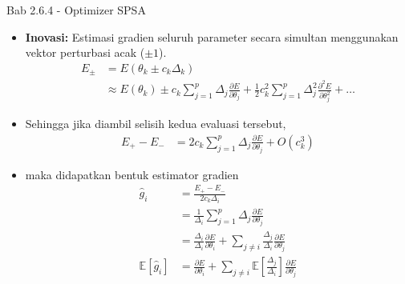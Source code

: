 \begin{frame}{Bab 2.6.4 - Optimizer SPSA}
    \begin{itemize}
        \item \textbf{Inovasi:} Estimasi gradien seluruh parameter secara simultan menggunakan vektor perturbasi acak ($\pm 1$).
        {\tiny
        \begin{equation}
            \begin{split}
                E_{\pm} &= E(\theta_k \pm c_k \Delta_k) \\ 
                &\approx E(\theta_k) \pm c_k \sum_{j=1}^p \Delta_j \frac{\partial E}{\partial \theta_j} + \frac{1}{2} c_k^2 \sum_{j=1}^p \Delta_j^2 \frac{\partial^2 E}{\partial \theta_j^2} + \dots
            \end{split}
        \end{equation}
        }
        \item Sehingga jika diambil selisih kedua evaluasi tersebut,
        {\tiny
        \begin{equation}
            \begin{split}
                E_+ - E_- &= 2 c_k \sum_{j=1}^p \Delta_j \frac{\partial E}{\partial \theta_j} + O(c_k^3)
            \end{split}
        \end{equation}
        }
        \item maka didapatkan bentuk estimator gradien
        {\tiny
        \begin{equation}
            \begin{split}
                \hat{g}_i &= \frac{E_+ - E_-}{2 c_k \Delta_i} \\
                &= \frac{1}{\Delta_i} \sum_{j=1}^p \Delta_j \frac{\partial E}{\partial \theta_j} \\
                &= \frac{\Delta_i}{\Delta_i} \frac{\partial E}{\partial \theta_i} + \sum_{j \neq i} \frac{\Delta_j}{\Delta_i} \frac{\partial E}{\partial \theta_j} \\
                \mathbb{E} \left[ \hat{g}_i \right] &= \frac{\partial E}{\partial \theta_i} + \sum_{j \neq i} \mathbb{E} \left[ \frac{\Delta_j}{\Delta_i} \right] \frac{\partial E}{\partial \theta_j}
            \end{split}
        \end{equation}
        }
    \end{itemize}
\end{frame}

